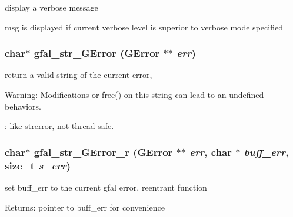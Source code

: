 display a verbose message 

msg is displayed if current verbose level is superior to verbose mode specified 
\subsubsection{\setlength{\rightskip}{0pt plus 5cm}char$\ast$ gfal\_\-str\_\-GError (GError $\ast$$\ast$ {\em err})}\label{gfal__common__errverbose_8h_c35c45ff43533cc6e7c176b0fa0b3128}


return a valid string of the current error, \begin{Desc}
\item[Warning:]Modifications or free() on this string can lead to an undefined behaviors. 

: like strerror, not thread safe. \end{Desc}
\subsubsection{\setlength{\rightskip}{0pt plus 5cm}char$\ast$ gfal\_\-str\_\-GError\_\-r (GError $\ast$$\ast$ {\em err}, char $\ast$ {\em buff\_\-err}, size\_\-t {\em s\_\-err})}\label{gfal__common__errverbose_8h_4dec12f0df920db39c004776d7f04e6e}


set buff\_\-err to the current gfal error, reentrant function \begin{Desc}
\item[Returns:]pointer to buff\_\-err for convenience \end{Desc}
